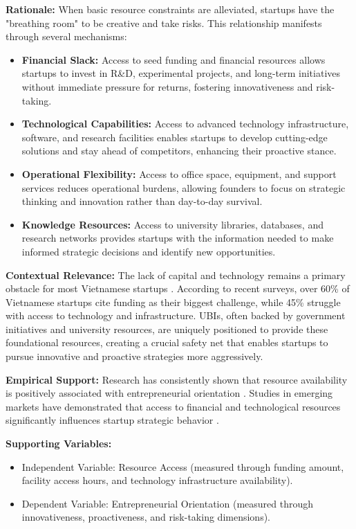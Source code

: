 \documentclass[../Main.tex]{subfiles}
\begin{document}
    \textbf{Rationale:} When basic resource constraints are alleviated, startups have the "breathing room" to be creative and take risks. This relationship manifests through several mechanisms:
    \begin{itemize}
        \item \textbf{Financial Slack:} Access to seed funding and financial resources allows startups to invest in R\&D, experimental projects, and long-term initiatives without immediate pressure for returns, fostering innovativeness and risk-taking.
        \item \textbf{Technological Capabilities:} Access to advanced technology infrastructure, software, and research facilities enables startups to develop cutting-edge solutions and stay ahead of competitors, enhancing their proactive stance.
        \item \textbf{Operational Flexibility:} Access to office space, equipment, and support services reduces operational burdens, allowing founders to focus on strategic thinking and innovation rather than day-to-day survival.
        \item \textbf{Knowledge Resources:} Access to university libraries, databases, and research networks provides startups with the information needed to make informed strategic decisions and identify new opportunities.
    \end{itemize}
    
    \textbf{Contextual Relevance:} The lack of capital and technology remains a primary obstacle for most Vietnamese startups \cite{vietnam_innovation_report_2024}. According to recent surveys, over 60\% of Vietnamese startups cite funding as their biggest challenge, while 45\% struggle with access to technology and infrastructure. UBIs, often backed by government initiatives and university resources, are uniquely positioned to provide these foundational resources, creating a crucial safety net that enables startups to pursue innovative and proactive strategies more aggressively.
    
    \textbf{Empirical Support:} Research has consistently shown that resource availability is positively associated with entrepreneurial orientation \cite{wiklund2005entrepreneurial}. Studies in emerging markets have demonstrated that access to financial and technological resources significantly influences startup strategic behavior \cite{bruton2010governance}.
    
    \textbf{Supporting Variables:}
    \begin{itemize}
        \item Independent Variable: Resource Access (measured through funding amount, facility access hours, and technology infrastructure availability).
        \item Dependent Variable: Entrepreneurial Orientation (measured through innovativeness, proactiveness, and risk-taking dimensions).
    \end{itemize}
\end{document}
